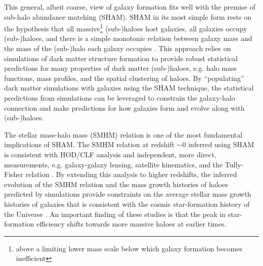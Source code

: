 \documentclass[a4paper,fleqn,usenatbib]{mnras}
\begin{document}
This general, albeit coarse, view of galaxy formation fits well with the premise of sub-halo abundance matching (SHAM).  SHAM in its most simple form rests on the hypothesis that all massive\footnote{above a limiting lower mass scale below which galaxy formation becomes inefficient} (sub-)haloes host galaxies, all galaxies occupy (sub-)haloes, and there is a simple monotonic relation between galaxy mass and the mass of the (sub-)halo each galaxy occupies \citep{Kravtsov:2004fi, Conroy:2006iz, Vale:2004bb}.  This approach relies on simulations of dark matter structure formation to provide robust statistical predictions for many properties of dark matter (sub-)haloes, e.g. halo mass functions, mass profiles, and the spatial clustering of haloes.  By ``populating'' dark matter simulations with galaxies using the SHAM technique, the statistical predictions from simulations can be leveraged to constrain the galaxy-halo connection and make predictions for how galaxies form and evolve along with (sub-)haloes.

The stellar mass-halo mass (SMHM) relation is one of the most fundamental implications of SHAM.  The SMHM relation at redshift $\sim 0$ inferred using SHAM is consistent with HOD/CLF analysis \citep{Yang:2003du, vandenBosch:2003fd, vandenBosch:2007ea, Yang:2013hw, Zu:2015tt} and independent, more direct, measurements,  e.g. galaxy-galaxy lensing, satellite kinematics, and the Tully-Fisher relation \citep{Wang:2006fe, More:2009ws, Guo:2010do, Wang:2010ho, Moster:2010ep, Behroozi:2010ja, Mandelbaum:2015wt, Desmond:2015gr, vanUitert:2016fy}.  By extending this analysis to higher redshifts, the inferred evolution of the SMHM relation and the mass growth histories of haloes predicted by simulations provide constraints on the average stellar mass growth histories of galaxies that is consistent with the cosmic star-formation history of the Universe \citep{Conroy:2009ba, Wang:2010ho, Yang:2012ew, Moster:2013ab, Behroozi:2013fg}.  An important finding of these studies is that the peak in star-formation efficiency shifts towards more massive haloes at earlier times. 
\end{document}
